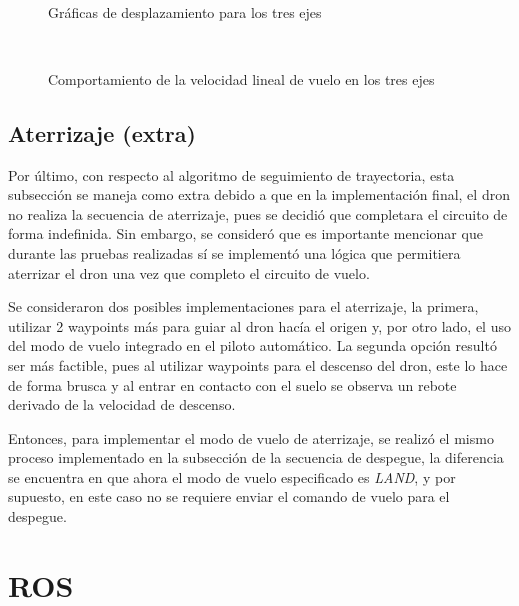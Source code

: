 \begin{figure}[ht]
    \centering
    \hfill
    \\
    \hfill

    \caption{Gráficas de desplazamiento para los tres ejes}
    \label{fig:pymav_missiond}
\end{figure}

\begin{figure}[ht]
    \centering
    \hfill
    \\
    \hfill

    \caption{Comportamiento de la velocidad lineal de vuelo en los tres ejes}
    \label{fig:pymav_missionv}
\end{figure}


\subsection{Aterrizaje (extra)}

Por último, con respecto al algoritmo de seguimiento de trayectoria, esta subsección se maneja como extra debido a que en la implementación final, el dron no realiza la secuencia de aterrizaje, pues se decidió que completara el circuito de forma indefinida. Sin embargo, se consideró que es importante mencionar que durante las pruebas realizadas sí se implementó una lógica que permitiera aterrizar el dron una vez que completo el circuito de vuelo. 

Se consideraron dos posibles implementaciones para el aterrizaje, la primera, utilizar 2 waypoints más para guiar al dron hacía el origen y, por otro lado, el uso del modo de vuelo integrado en el piloto automático. La segunda opción resultó ser más factible, pues al utilizar waypoints para el descenso del dron, este lo hace de forma brusca y al entrar en contacto con el suelo se observa un rebote derivado de la velocidad de descenso.

Entonces, para implementar el modo de vuelo de aterrizaje, se realizó el mismo proceso implementado en la subsección de la secuencia de despegue, la diferencia se encuentra en que ahora el modo de vuelo especificado es \textit{LAND}, y por supuesto, en este caso no se requiere enviar el comando de vuelo para el despegue.


\section{ROS}







